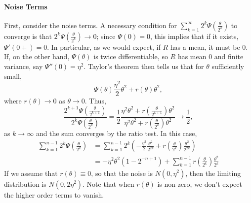 \documentclass{article}
\newcommand{\1}{\mathbbm{1}}
\theoremstyle{remark}
\theoremstyle{definition}
\begin{document}
\paragraph{Noise Terms}
First, consider the noise terms.  A necessary condition for $\sum_{k=1}^{\infty} 2^{k} \Psi\left(\frac{\theta}{2^{k}}\right)$ to converge is that $2^{k} \Psi\left(\frac{\theta}{2^{k}}\right) \to 0$; since $\Psi(0) = 0$, this implies that if it exists, $\Psi'(0+) = 0$.  In particular, as we would expect, if $R$ has a mean, it must be 0.  If, on the other hand, $\Psi(\theta)$ is twice differentiable, so $R$ has mean 0 and finite variance, say $\Psi''(0) = \eta^{2}$.  Taylor's theorem then tells us that for $\theta$ sufficiently small, 
\[
	\Psi(\theta) \frac{\eta^{2}}{2} \theta^{2} + r(\theta)\theta^{2},
\]
where $r(\theta) \to 0$ as $\theta \to 0$.  Thus,
\begin{equation*}
	\frac{\textstyle 2^{k+1} \Psi\left(\frac{\theta}{2^{k+1}}\right)}{\textstyle 2^{k} \Psi\left(\frac{\theta}{2^{k}}\right)}
	= \frac{1}{2} \frac{\eta^{2} \theta^{2} + {\textstyle  r\left(\frac{\theta}{2^{k+1}}\right)}\theta^{2}}{\eta^{2} \theta^{2} + {\textstyle  r\left(\frac{\theta}{2^{k}}\right)}\theta^{2}}
	\to \frac{1}{2},
\end{equation*}
as $k \to \infty$ and the sum converges by the ratio test.  In this case,
\begin{align*}
	 \sum_{k=1}^{n-1}  {\textstyle 2^{k} \Psi\left(\frac{\theta}{2^{k}}\right)}
	 &=  \sum_{k=1}^{n-1} 2^{k} {\textstyle \left(- \frac{\eta^{2}}{2}  \frac{\theta^{2}}{2^{2k}}
		+ r\left(\frac{\theta}{2^{k}}\right)\frac{\theta^{2}}{2^{2k}}\right)}\\
	&=- \eta^{2} \theta^{2} (1 - 2^{-n+1})  + \sum_{k=1}^{n-1} {\textstyle r\left(\frac{\theta}{2^{k}}\right)\frac{\theta^{2}}{2^{k}}}
\end{align*}
If we assume that $r(\theta) \equiv 0$, so that the noise is $N(0,\eta^{2})$, then the limiting distribution is $N(0,2\eta^{2})$. Note that when  $r(\theta)$ is non-zero, we don't expect the higher order terms to vanish.
\end{document}
